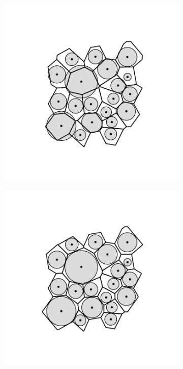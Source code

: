 \begin{figure}[bt]
     \centering
     
     \begin{subfigure}[b]{0.22\textwidth}
         \centering
         \includegraphics[width=\textwidth]{./figures/methods/voro_demo_vw.pdf}
         \caption{}
         \label{fig:vorodemov1}
     \end{subfigure}
     \hfill
     \begin{subfigure}[b]{0.22\textwidth}
         \centering
         \includegraphics[width=\textwidth]{./figures/methods/voro_demo_rw.pdf}

\end{subfigure}
\end{figure}
